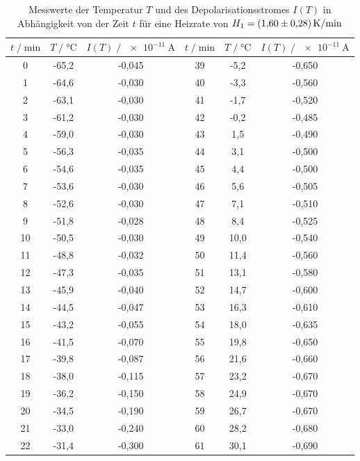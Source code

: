 \begin{table}
  \centering
  \caption{Messwerte der Temperatur $T$ und des Depolarisationsstromes $I(T)$ in Abhängigkeit von der Zeit $t$ für eine
  Heizrate von $H_1 = \SI{1.60 +- 0.28}{\kelvin\per\minute}$}
  \label{tab:mess1}
  \begin{tabular}{c c c c c c}
  \toprule
  $t \;/\; \si{\minute}$ & $T \;/\; \si{\celsius}$ & $I(T) \;/\; \SI{e-11}{\ampere}$ & 
  $t \;/\; \si{\minute}$ & $T \;/\; \si{\celsius}$ & $I(T) \;/\; \SI{e-11}{\ampere}$ \\
  \midrule
      0 & -65,2 & -0,045 & 39 & -5,2 & -0,650 \\
      1 & -64,6 & -0,030 & 40 & -3,3 & -0,560 \\
      2 & -63,1 & -0,030 & 41 & -1,7 & -0,520 \\
      3 & -61,2 & -0,030 & 42 & -0,2 & -0,485 \\
      4 & -59,0 & -0,030 & 43 &  1,5 & -0,490 \\
      5 & -56,3 & -0,035 & 44 &  3,1 & -0,500 \\
      6 & -54,6 & -0,035 & 45 &  4,4 & -0,500 \\
      7 & -53,6 & -0,030 & 46 &  5,6 & -0,505 \\
      8 & -52,6 & -0,030 & 47 &  7,1 & -0,510 \\
      9 & -51,8 & -0,028 & 48 &  8,4 & -0,525 \\
     10 & -50,5 & -0,030 & 49 & 10,0 & -0,540 \\
     11 & -48,8 & -0,032 & 50 & 11,4 & -0,560 \\
     12 & -47,3 & -0,035 & 51 & 13,1 & -0,580 \\
     13 & -45,9 & -0,040 & 52 & 14,7 & -0,600 \\
     14 & -44,5 & -0,047 & 53 & 16,3 & -0,610 \\
     15 & -43,2 & -0,055 & 54 & 18,0 & -0,635 \\
     16 & -41,5 & -0,070 & 55 & 19,8 & -0,650 \\
     17 & -39,8 & -0,087 & 56 & 21,6 & -0,660 \\
     18 & -38,0 & -0,115 & 57 & 23,2 & -0,670 \\
     19 & -36,2 & -0,150 & 58 & 24,9 & -0,670 \\
     20 & -34,5 & -0,190 & 59 & 26,7 & -0,670 \\
     21 & -33,0 & -0,240 & 60 & 28,2 & -0,680 \\
     22 & -31,4 & -0,300 & 61 & 30,1 & -0,690 \\

\end{tabular}
\end{table}
